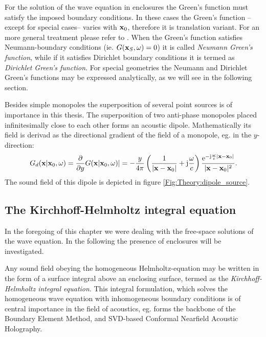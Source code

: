 \vspace{3mm}
For the solution of the wave equation in enclosures the Green's function must satisfy the imposed boundary conditions. In these cases the Green's function --except for special cases-- varies with $\mathbf{x}_0$, therefore it is translation variant.
For an more general treatment please refer to \cite{Spors2005}. 
When the Green's function satisfies Neumann-boundary conditions (ie. $G(\mathbf{x}_{S},\omega) = 0$) it is called \emph{Neumann Green's function}, while if it satisfies Dirichlet boundary conditions it is termed as \emph{Dirichlet Green's function}.
For special geometries the Neumann and Dirichlet Green's functions may be expressed analytically, as we will see in the following section.

\vspace{3mm}
Besides simple monopoles the superposition of several point sources is of importance in this thesis. The superposition of two anti-phase monopoles placed infinitesimally close to each other forms an acoustic dipole. Mathematically its field is derivad as the directional gradient of the field of a monopole, eg. in the $y$-direction:
\begin{equation}
G_d(\mathbf{x}|\mathbf{x}_0,\omega) =
\frac{\partial}{\partial y} G(\mathbf{x}|\mathbf{x}_0,\omega)|= 
- \frac{y}{4\pi}\left( \frac{1}{| \mathbf{x} - \mathbf{x}_0 |} + \mathrm{j} \frac{\omega}{c} \right) 
\frac{\mathrm{e}^{-\mathrm{j} \frac{\omega}{c}  | \mathbf{x} - \mathbf{x}_0 | }}{| \mathbf{x} - \mathbf{x}_0 |^2}.
\end{equation}
The sound field of this dipole is depicted in figure \ref{Fig:Theory:dipole_source}.

\newpage
\subsection{The Kirchhoff-Helmholtz integral equation}

In the foregoing of this chapter we were dealing with the free-space solutions of the wave equation. In the following the presence of enclosures will be investigated.

Any sound field obeying the homogeneous Helmholtz-equation may be written in the form of a surface integral above an enclosing surface, termed as the \emph{Kirchhoff-Helmholtz integral equation}. This integral formulation, which solves the homogeneous wave equation with inhomogeneous boundary conditions is of central importance in the field of acoustics, eg. forms the backbone of the Boundary Element Method, and SVD-based Conformal Nearfield Acoustic Holography.

